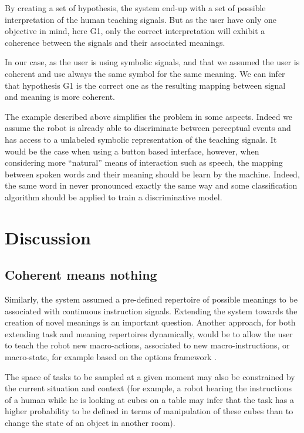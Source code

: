 By creating a set of hypothesis, the system end-up with a set of possible interpretation of the human teaching signals. But as the user have only one objective in mind, here G1, only the correct interpretation will exhibit a coherence between the signals and their associated meanings. 

In our case, as the user is using symbolic signals, and that we assumed the user is coherent and use always the same symbol for the same meaning. We can infer that hypothesis G1 is the correct one as the resulting mapping between signal and meaning is more coherent.


The example described above simplifies the problem in some aspects. Indeed we assume the robot is already able to discriminate between perceptual events and has access to a unlabeled symbolic representation of the teaching signals. It would be the case when using a button based interface, however, when considering more ``natural'' means of interaction such as speech, the mapping between spoken words and their meaning should be learn by the machine. Indeed, the same word in never pronounced exactly the same way and some classification algorithm should be applied to train a discriminative model.


\section{Discussion}

\subsection{Coherent means nothing}

Similarly, the system assumed a pre-defined repertoire of possible meanings to be associated with continuous instruction signals. Extending the system towards the creation of novel meanings is an important question. Another approach, for both extending task and meaning repertoires dynamically, would be to allow the user to teach the robot new macro-actions, associated to new macro-instructions, or macro-state, for example based on the options framework \cite{sutton1999between}.

The space of tasks to be sampled at a given moment may also be constrained by the current situation and context (for example, a robot hearing the instructions of a human while he is looking at cubes on a table may infer that the task has a higher probability to be defined in terms of manipulation of these cubes than to change the state of an object in another room). 